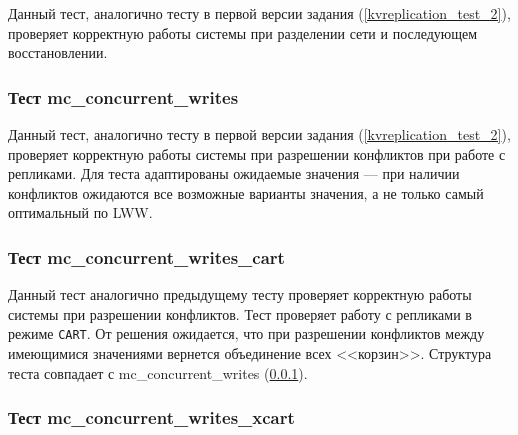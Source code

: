 \documentclass[a4paper,12pt]{extarticle}
\begin{document}
Данный тест, аналогично тесту в первой версии задания (\cref{kvreplication_test_2}), проверяет корректную работы системы при разделении сети и последующем восстановлении.


\subsubsection{Тест mc\_concurrent\_writes}
\label{kv_replication_test_3}

Данный тест, аналогично тесту в первой версии задания (\cref{kvreplication_test_2}), проверяет корректную работы системы при разрешении конфликтов при работе с репликами.
Для теста адаптированы ожидаемые значения --- при наличии конфликтов ожидаются все возможные варианты значения, а не только самый оптимальный по LWW.

\subsubsection{Тест mc\_concurrent\_writes\_cart}

Данный тест аналогично предыдущему тесту проверяет корректную работы системы при разрешении конфликтов.
Тест проверяет работу с репликами в режиме \texttt{CART}.
От решения ожидается, что при разрешении конфликтов между имеющимися значениями вернется объединение всех <<корзин>>.
Структура теста совпадает с mc\_concurrent\_writes (\cref{kv_replication_test_3}).

\subsubsection{Тест mc\_concurrent\_writes\_xcart}
\end{document}
